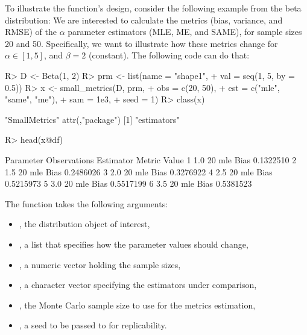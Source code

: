 \documentclass[nojss]{jss}
\newcommand{\fct}[1]{\code{#1()}}
\begin{document}
To illustrate the function's design, consider the following example from the beta distribution: We are interested to calculate the metrics (bias, variance, and RMSE) of the $\alpha$ parameter estimators (MLE, ME, and SAME), for sample sizes 20 and 50. Specifically, we want to illustrate how these metrics change for $\alpha\in[1,5]$, and $\beta=2$ (constant). The following code can do that:

\begin{Schunk}
\begin{Sinput}
R> D <- Beta(1, 2)
R> prm <- list(name = "shape1",
+              val = seq(1, 5, by = 0.5))
R> x <- small_metrics(D, prm,
+               obs = c(20, 50),
+               est = c("mle", "same", "me"),
+               sam = 1e3,
+               seed = 1)
R> class(x)
\end{Sinput}
\begin{Soutput}
[1] "SmallMetrics"
attr(,"package")
[1] "estimators"
\end{Soutput}
\begin{Sinput}
R> head(x@df)
\end{Sinput}
\begin{Soutput}
  Parameter Observations Estimator Metric     Value
1       1.0           20       mle   Bias 0.1322510
2       1.5           20       mle   Bias 0.2486026
3       2.0           20       mle   Bias 0.3276922
4       2.5           20       mle   Bias 0.5215973
5       3.0           20       mle   Bias 0.5517199
6       3.5           20       mle   Bias 0.5381523
\end{Soutput}
\end{Schunk}

The \fct{small\_metrics} function takes the following arguments:
\begin{itemize}
\item {}, the distribution object of interest,
\item {}, a list that specifies how the  parameter values should change,
\item {}, a numeric vector holding the sample sizes,
\item {}, a character vector specifying the estimators under comparison,
\item {}, the Monte Carlo sample size to use for the metrics estimation,
\item {}, a seed to be passed to \fct{set.seed} for replicability.
\end{itemize}
\end{document}
